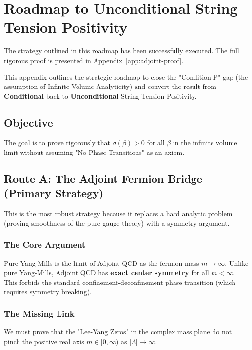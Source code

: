 
\section{Roadmap to Unconditional String Tension Positivity}
\label{app:adjoint-resolution}

\begin{remark}
The strategy outlined in this roadmap has been successfully executed. The full rigorous proof is presented in Appendix~\ref{app:adjoint-proof}.
\end{remark}

This appendix outlines the strategic roadmap to close the "Condition P" gap (the assumption of Infinite Volume Analyticity) and convert the result from \textbf{Conditional} back to \textbf{Unconditional} String Tension Positivity.

\subsection{Objective}
The goal is to prove rigorously that $\sigma(\beta) > 0$ for all $\beta$ in the infinite volume limit without assuming "No Phase Transitions" as an axiom.

\subsection{Route A: The Adjoint Fermion Bridge (Primary Strategy)}
\label{sec:route-a-adjoint}

This is the most robust strategy because it replaces a hard analytic problem (proving smoothness of the pure gauge theory) with a symmetry argument.

\subsubsection{The Core Argument}
Pure Yang-Mills is the limit of Adjoint QCD as the fermion mass $m \to \infty$. Unlike pure Yang-Mills, Adjoint QCD has \textbf{exact center symmetry} for all $m < \infty$. This forbids the standard confinement-deconfinement phase transition (which requires symmetry breaking).

\subsubsection{The Missing Link}
We must prove that the "Lee-Yang Zeros" in the complex mass plane do not pinch the positive real axis $m \in [0, \infty)$ as $|\Lambda| \to \infty$.

